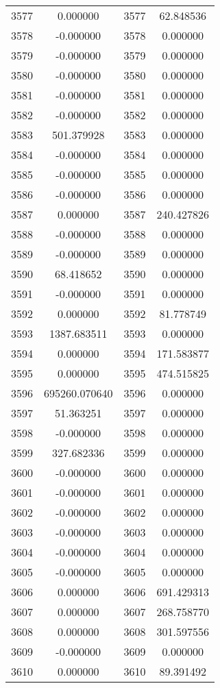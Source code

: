\documentclass[12pt]{article}
\begin{document}
\begin{longtable}{@{}cccc@{}}
3577 & 0.000000 & 3577 & 62.848536 \\
3578 & -0.000000 & 3578 & 0.000000 \\
3579 & -0.000000 & 3579 & 0.000000 \\
3580 & -0.000000 & 3580 & 0.000000 \\
3581 & -0.000000 & 3581 & 0.000000 \\
3582 & -0.000000 & 3582 & 0.000000 \\
3583 & 501.379928 & 3583 & 0.000000 \\
3584 & -0.000000 & 3584 & 0.000000 \\
3585 & -0.000000 & 3585 & 0.000000 \\
3586 & -0.000000 & 3586 & 0.000000 \\
3587 & 0.000000 & 3587 & 240.427826 \\
3588 & -0.000000 & 3588 & 0.000000 \\
3589 & -0.000000 & 3589 & 0.000000 \\
3590 & 68.418652 & 3590 & 0.000000 \\
3591 & -0.000000 & 3591 & 0.000000 \\
3592 & 0.000000 & 3592 & 81.778749 \\
3593 & 1387.683511 & 3593 & 0.000000 \\
3594 & 0.000000 & 3594 & 171.583877 \\
3595 & 0.000000 & 3595 & 474.515825 \\
3596 & 695260.070640 & 3596 & 0.000000 \\
3597 & 51.363251 & 3597 & 0.000000 \\
3598 & -0.000000 & 3598 & 0.000000 \\
3599 & 327.682336 & 3599 & 0.000000 \\
3600 & -0.000000 & 3600 & 0.000000 \\
3601 & -0.000000 & 3601 & 0.000000 \\
3602 & -0.000000 & 3602 & 0.000000 \\
3603 & -0.000000 & 3603 & 0.000000 \\
3604 & -0.000000 & 3604 & 0.000000 \\
3605 & -0.000000 & 3605 & 0.000000 \\
3606 & 0.000000 & 3606 & 691.429313 \\
3607 & 0.000000 & 3607 & 268.758770 \\
3608 & 0.000000 & 3608 & 301.597556 \\
3609 & -0.000000 & 3609 & 0.000000 \\
3610 & 0.000000 & 3610 & 89.391492 \\

\end{longtable}
\end{document}
